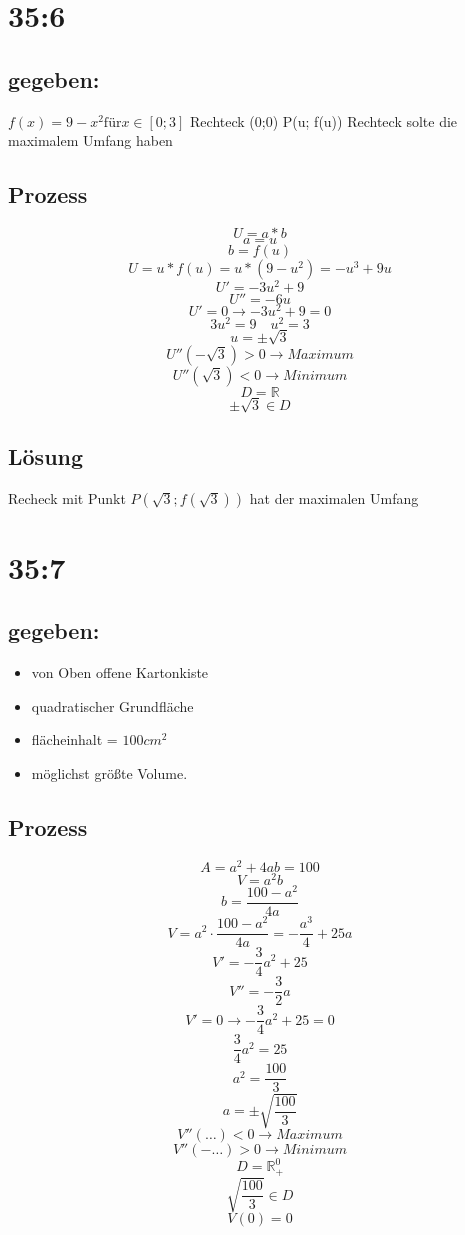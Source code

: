 \documentclass[twocolumn]{article}
\begin{document}
\section{35:6}
\subsection{gegeben: }
 $f(x) = 9-x^2 \text{für} x \in [0;3]$
Rechteck (0;0) P(u; f(u)) 
Rechteck solte die maximalem Umfang haben
\subsection{Prozess}
\[U = a*b \]
\[a = u\]
 \[b = f(u)\]
 \[U = u*f(u) = u*(9-u^2) = -u^3+9u\]
 \[U' = -3u^2+9\]
 \[U'' = -6u\]
 \[U' = 0 \rightarrow -3u^2+9 = 0\]
 \[3u^2 = 9\quad u^2 = 3\]
 \[u = \pm \sqrt3\]
 \[U''(-\sqrt3) > 0 \rightarrow Maximum\]
  \[U''(\sqrt3) < 0 \rightarrow Minimum\]
 \[D = \mathbb{R} \]
 \[\pm \sqrt3 \in D\]
 \subsection{Lösung}
 Recheck mit Punkt $P(\sqrt3; f(\sqrt3))$ hat der maximalen Umfang
 
 \section{35:7}
 \subsection{gegeben:}
 \begin{itemize}
 \item von Oben offene Kartonkiste
 \item quadratischer Grundfläche
 \item flächeinhalt = $100cm^2 $
 \item möglichst größte Volume.
 \end{itemize}
 
 \subsection{Prozess}
 \[A = a^2 + 4 ab = 100\]
 \[V= a^2 b\]
\[ b = \frac {100-a^2}{4a}\]
\[V = a^2 \cdot \frac {100-a^2}{4a} = -\frac{a^3}4+25a\]
\[V' = -\frac34 a^2+25 \]
\[V'' = -\frac32 a\]
\[V' = 0 \rightarrow -\frac34 a^2+25 = 0\]
\[\frac34 a^2 = 25\]
\[a^2 = \frac{100}3\]
\[a = \pm \sqrt{\frac{100}3}\]
\[V''(\dots) <0 \rightarrow Maximum\]
\[V''(-\dots) >0 \rightarrow Minimum\]
\[D = \mathbb{R}^0_+\]
\[\sqrt{\frac{100}3} \in D\]
\[V(0) = 0\]
\end{document}
